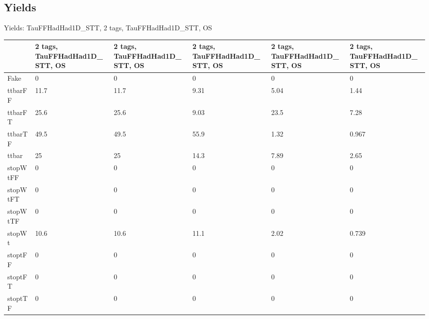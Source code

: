 
\subsection{Yields}

\begin{frame}{Yields: TauFFHadHad1D\_STT, 2 tags, TauFFHadHad1D\_STT, OS}
\begin{center}
  \begin{tabular}{l| >{\centering\let\newline\\\arraybackslash\hspace{0pt}}m{1.4cm}| >{\centering\let\newline\\\arraybackslash\hspace{0pt}}m{1.4cm}| >{\centering\let\newline\\\arraybackslash\hspace{0pt}}m{1.4cm}| >{\centering\let\newline\\\arraybackslash\hspace{0pt}}m{1.4cm}| >{\centering\let\newline\\\arraybackslash\hspace{0pt}}m{1.4cm}}
    & 2 tags, TauFFHadHad1D\_STT, OS & 2 tags, TauFFHadHad1D\_STT, OS & 2 tags, TauFFHadHad1D\_STT, OS & 2 tags, TauFFHadHad1D\_STT, OS & 2 tags, TauFFHadHad1D\_STT, OS \\
 \hline \hline
    Fake& 0 & 0 & 0 & 0 & 0 \\
 \hline
    ttbarFF& 11.7 & 11.7 & 9.31 & 5.04 & 1.44 \\
 \hline
    ttbarFT& 25.6 & 25.6 & 9.03 & 23.5 & 7.28 \\
 \hline
    ttbarTF& 49.5 & 49.5 & 55.9 & 1.32 & 0.967 \\
 \hline
    ttbar& 25 & 25 & 14.3 & 7.89 & 2.65 \\
 \hline
    stopWtFF& 0 & 0 & 0 & 0 & 0 \\
 \hline
    stopWtFT& 0 & 0 & 0 & 0 & 0 \\
 \hline
    stopWtTF& 0 & 0 & 0 & 0 & 0 \\
 \hline
    stopWt& 10.6 & 10.6 & 11.1 & 2.02 & 0.739 \\
 \hline
    stoptFF& 0 & 0 & 0 & 0 & 0 \\
 \hline
    stoptFT& 0 & 0 & 0 & 0 & 0 \\
 \hline
    stoptTF& 0 & 0 & 0 & 0 & 0 \\

\end{tabular}
\end{center}
\end{frame}
